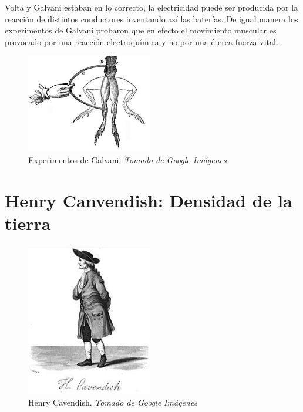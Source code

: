 \documentclass[journal]{IEEEtran}
\begin{document}
Volta y Galvani estaban en lo correcto, la electricidad puede ser producida por la reacción de distintos conductores inventando así las baterías. De igual manera
los experimentos de Galvani probaron que en efecto el movimiento muscular es provocado por una reacción electroquímica y no por una éterea fuerza vital.\cite{johnson_2014}

\begin{center}
  \begin{figure}[h!]
  \includegraphics[width=55mm]{frogs.png}
  \caption{Experimentos de Galvani. \emph{Tomado de Google Imágenes}}
  \end{figure}
\end{center}

\section{Henry Canvendish: Densidad de la tierra}

\begin{center}
  \begin{figure}[h!]
  \includegraphics[width=55mm]{Cavendish.jpg}
  \caption{Henry Cavendish. \emph{Tomado de Google Imágenes}}
  \end{figure}
\end{center}
\end{document}
